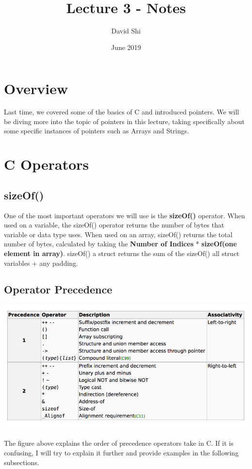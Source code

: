 \documentclass[letterpaper]{article}
\title{Lecture 3 - Notes}
\author{David Shi}
\date{June 2019}
\theoremstyle{remark}
\begin{document}
\maketitle

\section{Overview}
Last time, we covered some of the basics of C and introduced pointers. We will be diving more into the topic of pointers in this lecture, taking specifically about some specific instances of pointers such as Arrays and Strings.

\section{C Operators}

\subsection{sizeOf()}
One of the most important operators we will use is the \textbf{sizeOf()} operator. When used on a variable, the sizeOf() operator returns the number of bytes that variable or data type uses. When used on an array, sizeOf() returns the total number of bytes, calculated by taking the \textbf{Number of Indices} * \textbf{sizeOf(one element in array)}. sizeOf() a struct returns the sum of the sizeOf() all struct variables + any padding.

\subsection{Operator Precedence}
\includegraphics[scale=.5]{precedence}

The figure above explains the order of precedence operators take in C. If it is confusing, I will try to explain it further and provide examples in the following subsections.
\end{document}
